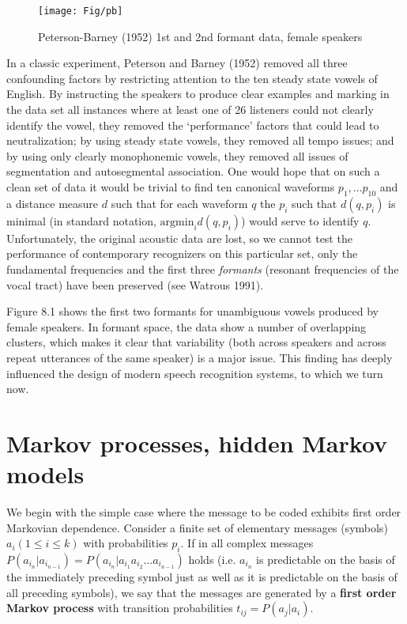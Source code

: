 \begin{figure}[hbt]
\texttt{[image: Fig/pb]}
\begin{center}
\caption{Peterson-Barney (1952) 1st and 2nd formant data, female speakers}
\end{center}
\end{figure}

In a classic experiment, Peterson and Barney (1952) removed all three
confounding factors by restricting attention to the ten steady state vowels of
English. \nocite{Peterson:1952} By instructing the speakers to produce clear
examples and marking in the data set all instances where at least one of 26
listeners could not clearly identify the vowel, they removed the `performance'
factors that could lead to neutralization; by using steady state vowels, they
removed all tempo issues; and by using only clearly monophonemic vowels, they
removed all issues of segmentation and autosegmental association.  One would
hope that on such a clean set of data it would be trivial to find ten
canonical waveforms $p_1, \ldots p_{10}$ and a distance measure $d$ such that
for each waveform $q$ the $p_i$ such that $d(q,p_i)$ is minimal (in standard
notation, $\mbox{argmin}_i d(q,p_i)$) would serve to identify $q$.
Unfortunately, the original acoustic data are lost, so we cannot test the
performance of contemporary recognizers on this particular set, only the
fundamental frequencies and the first three {\it formants} (resonant
frequencies of the vocal tract) have been preserved (see
Watrous 1991). \nocite{Watrous:1991}

Figure 8.1 shows the first two formants for unambiguous vowels produced by
female speakers. In formant space, the data show a number of overlapping
clusters, which makes it clear that variability (both across speakers and
across repeat utterances of the same speaker) is a major issue. This finding
has deeply influenced the design of modern speech recognition systems, to
which we turn now.

\section{Markov processes, hidden Markov models}

We begin with the simple case where the message to be coded exhibits first
order Markovian dependence. Consider a finite set of elementary messages
(symbols) $a_i (1 \leq i \leq k) $ with probabilities $p_i$. If in all complex
messages $ P(a_{i_n} | a_{i_{n-1}}) = P(a_{i_n} | a_{i_1} a_{i_2} \ldots
a_{i_{n-1}})$ holds (i.e. $a_{i_n}$ is predictable on the basis of the
immediately preceding symbol just as well as it is predictable on the basis of
all preceding symbols), we say that the messages are generated by a {\bf first
  order Markov process} with transition probabilities $t_{ij} = P(a_j |
a_i)$. 

